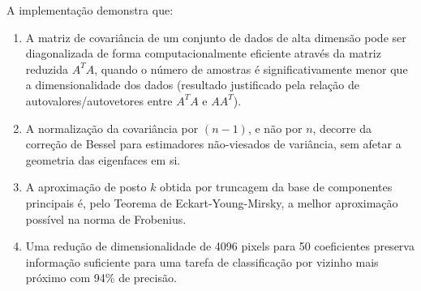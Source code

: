 \documentclass[12pt,a4paper]{article}
\begin{document}
A implementação demonstra que:

\begin{enumerate}
  \item A matriz de covariância de um conjunto de dados de alta dimensão pode ser
  diagonalizada de forma computacionalmente eficiente através da matriz reduzida
  $A^TA$, quando o número de amostras é significativamente menor que a
  dimensionalidade dos dados (resultado justificado pela relação de
  autovalores/autovetores entre $A^TA$ e $AA^T$).
  \item A normalização da covariância por $(n-1)$, e não por $n$, decorre da correção de
  Bessel para estimadores não-viesados de variância, sem afetar a geometria das
  eigenfaces em si.
  \item A aproximação de posto $k$ obtida por truncagem da base de componentes principais
  é, pelo Teorema de Eckart-Young-Mirsky, a melhor aproximação possível na norma de
  Frobenius.
  \item Uma redução de dimensionalidade de 4096 pixels para 50 coeficientes preserva
  informação suficiente para uma tarefa de classificação por vizinho mais próximo
  com 94\% de precisão.
\end{enumerate}
\end{document}
